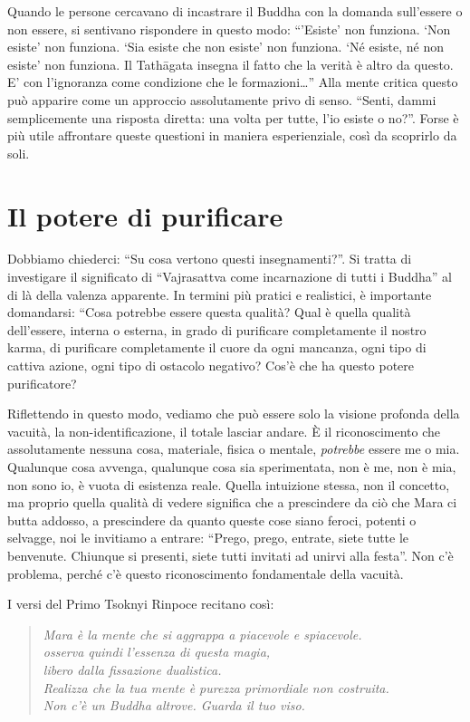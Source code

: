 Quando le persone cercavano di incastrare il Buddha con la domanda sull'essere o non essere, si sentivano rispondere in questo modo: ``\thinspace'Esiste' non funziona. `Non esiste' non funziona. `Sia esiste che non esiste' non funziona. `Né esiste, né non esiste' non funziona. Il Tathāgata insegna il fatto che la verità è altro da questo. E' con l'ignoranza come condizione che le formazioni\ldots{}'' Alla mente critica questo può apparire come un approccio assolutamente privo di senso. ``Senti, dammi semplicemente una risposta diretta: una volta per tutte, l'io esiste o no?''. Forse è più utile affrontare queste questioni in maniera esperienziale, così da scoprirlo da soli.

\section*{Il potere di purificare}

Dobbiamo chiederci: ``Su cosa vertono questi insegnamenti?''. Si tratta di investigare il significato di ``Vajrasattva come incarnazione di tutti i Buddha'' al di là della valenza apparente. In termini più pratici e realistici, è importante domandarsi: ``Cosa potrebbe essere questa qualità? Qual è quella qualità dell'essere, interna o esterna, in grado di purificare completamente il nostro karma, di purificare completamente il cuore da ogni mancanza, ogni tipo di cattiva azione, ogni tipo di ostacolo negativo? Cos'è che ha questo potere purificatore?

Riflettendo in questo modo, vediamo che può essere solo la visione profonda della vacuità, la non-identificazione, il totale lasciar andare. È il riconoscimento che assolutamente nessuna cosa, materiale, fisica o mentale, \textit{potrebbe} essere me o mia. Qualunque cosa avvenga, qualunque cosa sia sperimentata, non è me, non è mia, non sono io, è vuota di esistenza reale. Quella intuizione stessa, non il concetto, ma proprio quella qualità di vedere significa che a prescindere da ciò che Mara ci butta addosso, a prescindere da quanto queste cose siano feroci, potenti o selvagge, noi le invitiamo a entrare: ``Prego, prego, entrate, siete tutte le benvenute. Chiunque si presenti, siete tutti invitati ad unirvi alla festa''. Non c'è problema, perché c'è questo riconoscimento fondamentale della vacuità.

I versi del Primo Tsoknyi Rinpoce recitano così:

\begin{quote}
\itshape
Mara è la mente che si aggrappa a piacevole e spiacevole. \\
osserva quindi l'essenza di questa magia, \\
libero dalla fissazione dualistica. \\
Realizza che la tua mente è purezza primordiale non costruita. \\
Non c'è un Buddha altrove. Guarda il tuo viso.
\end{quote}

